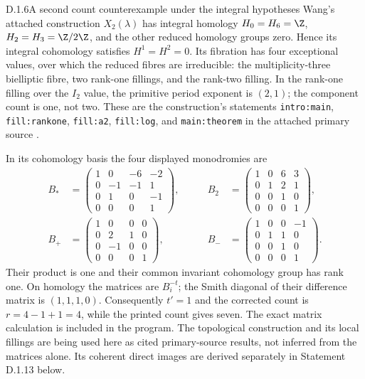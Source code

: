 \begin{idstatement}{D.1.6}{A second count counterexample under the integral hypotheses}
\label{st:D.1.6}
Wang's attached construction $X_2(\lambda)$ has integral homology
$H_0=H_6=\Z$, $H_2=H_3=\Z/2\Z$, and the other reduced
homology groups zero. Hence its integral cohomology satisfies
$H^1=H^2=0$. Its fibration has four exceptional values, over which
the reduced fibres are irreducible: the multiplicity-three
bielliptic fibre, two rank-one fillings, and the rank-two filling.
In the rank-one filling over the $I_2$ value, the primitive period
exponent is $(2,1)$; the component count is one, not two.
These are the construction's statements
\texttt{intro:main}, \texttt{fill:rankone},
\texttt{fill:a2}, \texttt{fill:log}, and
\texttt{main:theorem} in the attached primary source
\cite{Wang2026}.

In its cohomology basis the four displayed monodromies are
\[
\begin{aligned}
B_*&=\begin{pmatrix}1&0&-6&-2\\0&-1&-1&1\\0&1&0&-1\\0&0&0&1\end{pmatrix},&\qquad
B_2&=\begin{pmatrix}1&0&6&3\\0&1&2&1\\0&0&1&0\\0&0&0&1\end{pmatrix},\\
B_+&=\begin{pmatrix}1&0&0&0\\0&2&1&0\\0&-1&0&0\\0&0&0&1\end{pmatrix},&\qquad
B_-&=\begin{pmatrix}1&0&0&-1\\0&1&1&0\\0&0&1&0\\0&0&0&1\end{pmatrix}.
\end{aligned}
\]
Their product is one and their common invariant cohomology group
has rank one. On homology the matrices are $B_i^{-t}$; the Smith
diagonal of their difference matrix is $(1,1,1,0)$. Consequently
$t'=1$ and the corrected count is $r=4-1+1=4$, while the printed
count gives seven. The exact matrix calculation is included in the
program. The topological construction and its local fillings are
being used here as cited primary-source results, not inferred from
the matrices alone. Its coherent direct images are derived separately
in Statement D.1.13 below.
\end{idstatement}


